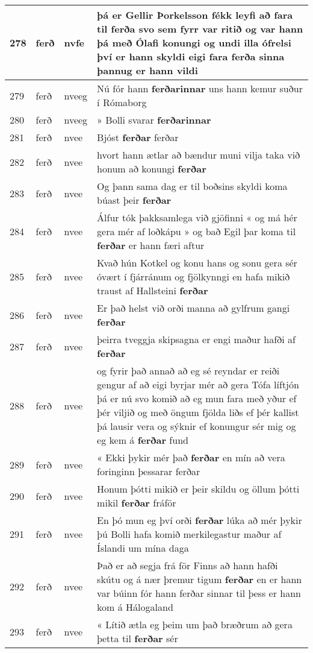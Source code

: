 \documentclass{article}
\begin{document}
\begin{longtable}{p{1cm}|p{1cm}|p{1cm}|p{13cm}}
\hline
278&ferð&nvfe&þá er Gellir Þorkelsson fékk leyfi að fara til \textbf{ferða} svo sem fyrr var ritið og var hann þá með Ólafi konungi og undi illa ófrelsi því er hann skyldi eigi fara ferða sinna þannug er hann vildi\\
\hline
279&ferð&nveeg&Nú fór hann \textbf{ferðarinnar} uns hann kemur suður í Rómaborg\\
\hline
280&ferð&nveeg&» Bolli svarar \textbf{ferðarinnar} \\
\hline
281&ferð&nvee&Bjóst \textbf{ferðar} ferðar\\
\hline
282&ferð&nvee&hvort hann ætlar að bændur muni vilja taka við honum að konungi \textbf{ferðar} \\
\hline
283&ferð&nvee&Og þann sama dag er til boðsins skyldi koma búast þeir \textbf{ferðar} \\
\hline
284&ferð&nvee&Álfur tók þakksamlega við gjöfinni « og má hér gera mér af loðkápu » og bað Egil þar koma til \textbf{ferðar} er hann færi aftur\\
\hline
285&ferð&nvee&Kvað hún Kotkel og konu hans og sonu gera sér óvært í fjárránum og fjölkynngi en hafa mikið traust af Hallsteini \textbf{ferðar} \\
\hline
286&ferð&nvee&Er það helst við orði manna að gylfrum gangi \textbf{ferðar} \\
\hline
287&ferð&nvee&þeirra tveggja skipsagna er engi maður hafði af \textbf{ferðar} \\
\hline
288&ferð&nvee&og fyrir það annað að eg sé reyndar er reiði gengur af að eigi byrjar mér að gera Tófa líftjón þá er nú svo komið að eg mun fara með yður ef þér viljið og með öngum fjölda liðs ef þér kallist þá lausir vera og sýknir ef konungur sér mig og eg kem á \textbf{ferðar} fund\\
\hline
289&ferð&nvee&« Ekki þykir mér það \textbf{ferðar} en mín að vera foringinn þessarar ferðar\\
\hline
290&ferð&nvee&Honum þótti mikið er þeir skildu og öllum þótti mikil \textbf{ferðar} fráför\\
\hline
291&ferð&nvee&En þó mun eg því orði \textbf{ferðar} lúka að mér þykir þú Bolli hafa komið merkilegastur maður af Íslandi um mína daga\\
\hline
292&ferð&nvee&Það er að segja frá för Finns að hann hafði skútu og á nær þremur tigum \textbf{ferðar} en er hann var búinn fór hann ferðar sinnar til þess er hann kom á Hálogaland\\
\hline
293&ferð&nvee&« Lítið ætla eg þeim um það bræðrum að gera þetta til \textbf{ferðar} sér\\

\end{longtable}
\end{document}
